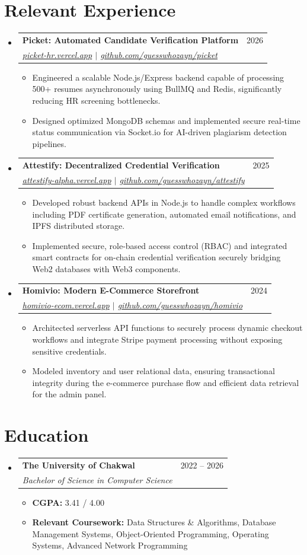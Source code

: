 \documentclass[letterpaper,11pt]{article}
\makeatletter
\newcommand{\resumeItem}[1]{
  \item\small{#1 \vspace{-2pt}}
}
\newcommand{\resumeSubheading}[4]{
  \vspace{-2pt}\item
    \begin{tabular*}{0.97\textwidth}[t]{l@{\extracolsep{\fill}}r}
      \textbf{#1} & #2 \\
      \textit{\small#3} & \textit{\small #4} \\
    \end{tabular*}\vspace{-7pt}
}
\newcommand{\resumeSubHeadingListStart}{\begin{itemize}[leftmargin=0.15in, label={}]}
\newcommand{\resumeSubHeadingListEnd}{\end{itemize}}
\newcommand{\resumeItemListStart}{\begin{itemize}}
\newcommand{\resumeItemListEnd}{\end{itemize}\vspace{-5pt}}
\makeatother
\begin{document}
\section{Relevant Experience}
\resumeSubHeadingListStart

  \resumeSubheading
    {Picket: Automated Candidate Verification Platform}{2026}
    {\href{https://picket-hr.vercel.app}{picket-hr.vercel.app} $|$ \href{https://github.com/guesswhozayn/picket}{github.com/guesswhozayn/picket}}{}
    \resumeItemListStart
      \resumeItem{Engineered a scalable Node.js/Express backend capable of processing 500+ resumes asynchronously using BullMQ and Redis, significantly reducing HR screening bottlenecks.}
      \resumeItem{Designed optimized MongoDB schemas and implemented secure real-time status communication via Socket.io for AI-driven plagiarism detection pipelines.}
    \resumeItemListEnd

  \resumeSubheading
    {Attestify: Decentralized Credential Verification}{2025}
    {\href{https://attestify-alpha.vercel.app}{attestify-alpha.vercel.app} $|$ \href{https://github.com/guesswhozayn/attestify}{github.com/guesswhozayn/attestify}}{}
    \resumeItemListStart
      \resumeItem{Developed robust backend APIs in Node.js to handle complex workflows including PDF certificate generation, automated email notifications, and IPFS distributed storage.}
      \resumeItem{Implemented secure, role-based access control (RBAC) and integrated smart contracts for on-chain credential verification securely bridging Web2 databases with Web3 components.}
    \resumeItemListEnd

  \resumeSubheading
    {Homivio: Modern E-Commerce Storefront}{2024}
    {\href{https://homivio-ecom.vercel.app}{homivio-ecom.vercel.app} $|$ \href{https://github.com/guesswhozayn/homivio}{github.com/guesswhozayn/homivio}}{}
    \resumeItemListStart
      \resumeItem{Architected serverless API functions to securely process dynamic checkout workflows and integrate Stripe payment processing without exposing sensitive credentials.}
      \resumeItem{Modeled inventory and user relational data, ensuring transactional integrity during the e-commerce purchase flow and efficient data retrieval for the admin panel.}
    \resumeItemListEnd

\resumeSubHeadingListEnd

\section{Education}
\resumeSubHeadingListStart
  \resumeSubheading
    {The University of Chakwal}{2022 -- 2026}
    {Bachelor of Science in Computer Science}{}
    \resumeItemListStart
      \resumeItem{\textbf{CGPA:} 3.41 / 4.00}
      \resumeItem{\textbf{Relevant Coursework:} Data Structures \& Algorithms, Database Management Systems, Object-Oriented Programming, Operating Systems, Advanced Network Programming}
    \resumeItemListEnd
\resumeSubHeadingListEnd
\end{document}
